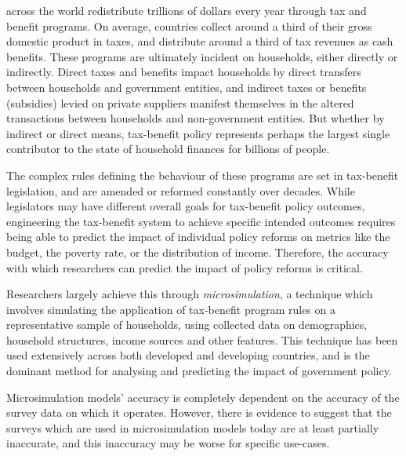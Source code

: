 \documentclass[10pt,journal,compsoc]{IEEEtran}
\begin{document}
% 
% 
 across the world redistribute trillions of dollars every year through tax and benefit programs. On average, countries collect around a third of their gross domestic product in taxes, and distribute around a third of tax revenues as cash benefits. These programs are ultimately incident on households, either directly or indirectly. Direct taxes and benefits impact households by direct transfers between households and government entities, and indirect taxes or benefits (subsidies) levied on private suppliers manifest themselves in the altered transactions between households and non-government entities. But whether by indirect or direct means, tax-benefit policy represents perhaps the largest single contributor to the state of household finances for billions of people. 

The complex rules defining the behaviour of these programs are set in tax-benefit legislation, and are amended or reformed constantly over decades. While legislators may have different overall goals for tax-benefit policy outcomes, engineering the tax-benefit system to achieve specific intended outcomes requires being able to predict the impact of individual policy reforms on metrics like the budget, the poverty rate, or the distribution of income. Therefore, the accuracy with which researchers can predict the impact of policy reforms is critical.

Researchers largely achieve this through \emph{microsimulation}, a technique which involves simulating the application of tax-benefit program rules on a representative sample of households, using collected data on demographics, household structures, income sources and other features. This technique has been used extensively across both developed and developing countries, and is the dominant method for analysing and predicting the impact of government policy.

Microsimulation models' accuracy is completely dependent on the accuracy of the survey data on which it operates. However, there is evidence to suggest that the surveys which are used in microsimulation models today are at least partially inaccurate, and this inaccuracy may be worse for specific use-cases.
\end{document}
